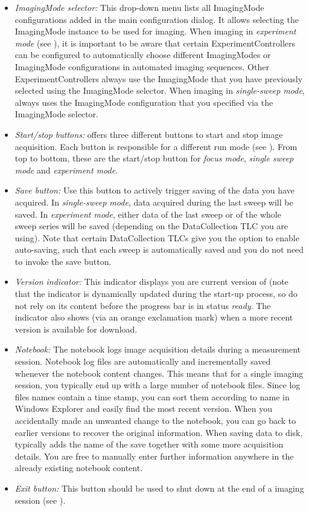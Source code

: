 \begin{itemize}
	\item \textit{ImagingMode selector:} This drop-down menu lists all ImagingMode configurations added in the \HS main configuration dialog. It allows selecting the ImagingMode instance to be used for imaging. When imaging in \textit{experiment mode} (see ), it is important to be aware that certain ExperimentControllers can be configured to automatically choose different ImagingModes or ImagingMode configurations in automated imaging sequences. Other ExperimentControllers always use the ImagingMode that you have previously selected using the ImagingMode selector. When imaging in \textit{single-sweep mode}, \HS always uses the ImagingMode configuration that you specified via the ImagingMode selector.
	\item \textit{Start/stop buttons:} \HS offers three different buttons to start and stop image acquisition. Each button is responsible for a different run mode  (see ). From top to bottom, these are the start/stop button for \textit{focus mode}, \textit{single sweep mode} and \textit{experiment mode}. 
	\item \textit{Save button:} Use this button to actively trigger saving of the data you have acquired. In \textit{single-sweep mode}, data acquired during the last sweep will be saved. In \textit{experiment mode}, either data of the last sweep or of the whole sweep series will be saved (depending on the DataCollection \ac{TLC} you are using). Note that certain DataCollection \acp{TLC} give you the option to enable auto-saving, such that each sweep is automatically saved and you do not need to invoke the save button.
	\item \textit{Version indicator:} This indicator displays you are current version of \HS (note that the indicator is dynamically updated during the start-up process, so do not rely on its content before the progress bar is in status \textit{ready}. The indicator also shows (via an orange exclamation mark) when a more recent \HS version is available for download.
	\item \textit{Notebook:} The notebook logs image acquisition details during a measurement session. Notebook log files are automatically and incrementally saved whenever the notebook content changes. This means that for a single imaging session, you typically end up with a large number of notebook files. Since log files names contain a time stamp, you can sort them according to name in Windows Explorer and easily find the most recent version. When you accidentally made an unwanted change to the notebook, you can go back to earlier versions to recover the original information. When saving data to disk, \HS typically adds the name of the save together with some more acquisition details. You are free to manually enter further information anywhere in the already existing notebook content.
	\item \textit{Exit button:} This button  should be used to shut down \HS at the end of a imaging session (see ).
\end{itemize}

